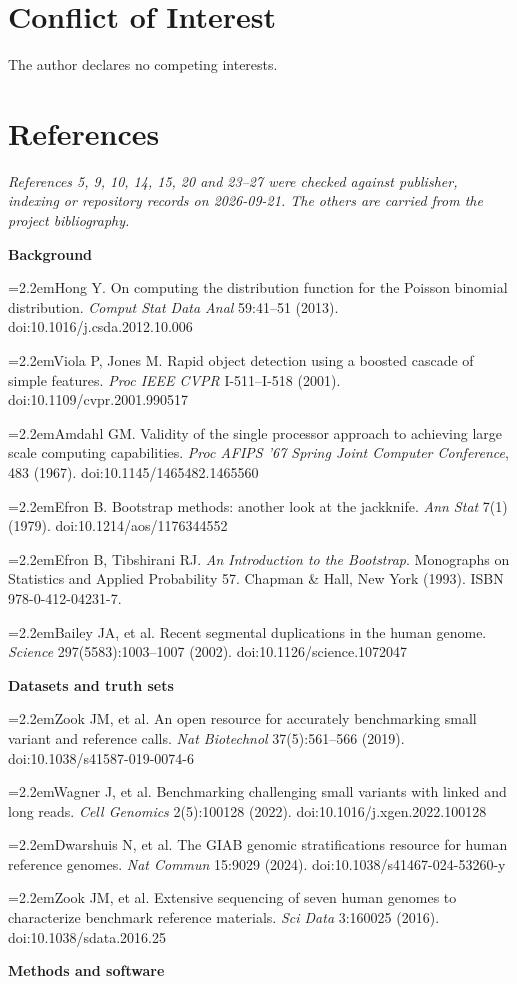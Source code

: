\documentclass[11pt,a4paper]{article}
\makeatletter
\newcommand{\needspace}[1]{\par\ifdim\pagegoal=\maxdimen\else\dimen@=\pagegoal\advance\dimen@-\pagetotal\ifdim\dimen@<#1\relax\newpage\fi\fi}
\newcommand{\refitem}[2]{\par\noindent\hangindent=2.2em\hangafter=1\makebox[2.2em][l]{[#1]}#2\par\vspace{2pt}}
\makeatother
\begin{document}
\FloatBarrier
\needspace{10\baselineskip}
\section*{\texorpdfstring{Conflict of Interest}{Conflict of Interest}}
The author declares no competing interests.

\FloatBarrier
\needspace{10\baselineskip}
\section*{\texorpdfstring{References}{References}}
\emph{References 5, 9, 10, 14, 15, 20 and 23--27 were checked against publisher, indexing or repository records on 2026-09-21. The others are carried from the project bibliography.}

\textbf{Background}

\refitem{1}{Hong Y. On computing the distribution function for the Poisson binomial distribution. \emph{Comput Stat Data Anal} 59:41--51 (2013). doi:10.\allowbreak{}1016/\allowbreak{}j.\allowbreak{}csda.\allowbreak{}2012.\allowbreak{}10.\allowbreak{}006}
\refitem{2}{Viola P, Jones M. Rapid object detection using a boosted cascade of simple features. \emph{Proc IEEE CVPR} I-511--I-518 (2001). doi:10.\allowbreak{}1109/\allowbreak{}cvpr.\allowbreak{}2001.\allowbreak{}990517}
\refitem{3}{Amdahl GM. Validity of the single processor approach to achieving large scale computing capabilities. \emph{Proc AFIPS '67 Spring Joint Computer Conference}, 483 (1967). doi:10.\allowbreak{}1145/\allowbreak{}1465482.\allowbreak{}1465560}
\refitem{4}{Efron B. Bootstrap methods: another look at the jackknife. \emph{Ann Stat} 7(1) (1979). doi:10.\allowbreak{}1214/\allowbreak{}aos/\allowbreak{}1176344552}
\refitem{5}{Efron B, Tibshirani RJ. \emph{An Introduction to the Bootstrap}. Monographs on Statistics and Applied Probability 57. Chapman \& Hall, New York (1993). ISBN 978-0-412-04231-7.}
\refitem{6}{Bailey JA, et al. Recent segmental duplications in the human genome. \emph{Science} 297(5583):1003--1007 (2002). doi:10.\allowbreak{}1126/\allowbreak{}science.\allowbreak{}1072047}
\textbf{Datasets and truth sets}

\refitem{7}{Zook JM, et al. An open resource for accurately benchmarking small variant and reference calls. \emph{Nat Biotechnol} 37(5):561--566 (2019). doi:10.\allowbreak{}1038/\allowbreak{}s41587-019-0074-6}
\refitem{8}{Wagner J, et al. Benchmarking challenging small variants with linked and long reads. \emph{Cell Genomics} 2(5):100128 (2022). doi:10.\allowbreak{}1016/\allowbreak{}j.\allowbreak{}xgen.\allowbreak{}2022.\allowbreak{}100128}
\refitem{9}{Dwarshuis N, et al. The GIAB genomic stratifications resource for human reference genomes. \emph{Nat Commun} 15:9029 (2024). doi:10.\allowbreak{}1038/\allowbreak{}s41467-024-53260-y}
\refitem{10}{Zook JM, et al. Extensive sequencing of seven human genomes to characterize benchmark reference materials. \emph{Sci Data} 3:160025 (2016). doi:10.\allowbreak{}1038/\allowbreak{}sdata.\allowbreak{}2016.\allowbreak{}25}
\textbf{Methods and software}
\end{document}
